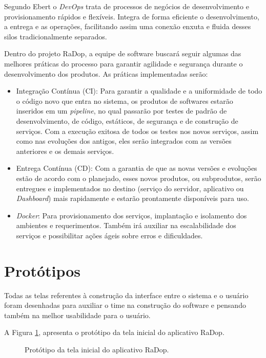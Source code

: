 Segundo Ebert \cite{ebert2016devops} o \textit{DevOps} trata de processos de negócios de desenvolvimento e provisionamento rápidos e flexíveis. Integra de forma eficiente o desenvolvimento, a entrega e as operações, facilitando assim uma conexão enxuta e fluida desses silos tradicionalmente separados.

Dentro do projeto RaDop, a equipe de software buscará seguir algumas das melhores práticas do processo para garantir agilidade e segurança durante o desenvolvimento dos produtos. As práticas implementadas serão:
\begin{itemize}
    \item Integração Contínua (CI): Para garantir a qualidade e a uniformidade de todo o código novo que entra no sistema, os produtos de softwares estarão inseridos em um \textit{pipeline}, no qual passarão por testes de padrão de desenvolvimento, de código, estáticos, de segurança e de construção de serviços. Com a execução exitosa de todos os testes nos novos serviços, assim como nas evoluções dos antigos, eles serão integrados com as versões anteriores e os demais serviços.
    \item Entrega Contínua (CD): Com a garantia de que as novas versões e evoluções estão de acordo com o planejado, esses novos produtos, ou subprodutos, serão entregues e implementados no destino (serviço do servidor, aplicativo ou \textit{Dashboard}) mais rapidamente e estarão prontamente disponíveis para uso.
    \item \textit{Docker}: Para provisionamento dos serviços, implantação e isolamento dos ambientes e requerimentos. Também irá auxiliar na escalabilidade dos serviços e possibilitar ações ágeis sobre erros e dificuldades.
\end{itemize}

\section{Protótipos}

Todas as telas referentes à construção da interface entre o sistema e o usuário foram desenhadas para auxiliar o time na construção do software e pensando também na melhor usabilidade para o usuário.

A Figura \ref{fig:tela_inicial}, apresenta o protótipo da tela inicial do aplicativo RaDop.

\begin{figure}[H]
	\caption{\label{fig:tela_inicial} Protótipo da tela inicial do aplicativo RaDop.}
\end{figure}

